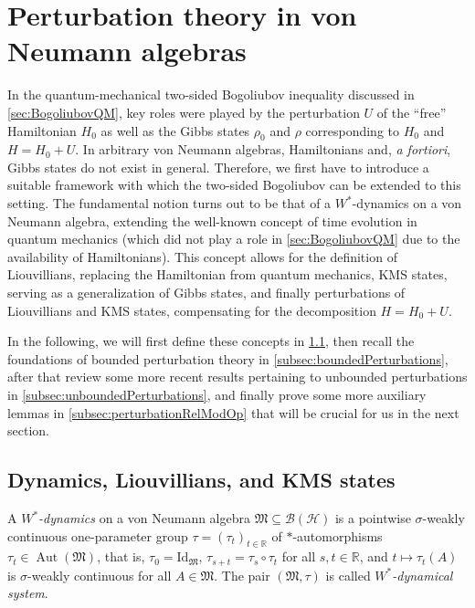 \documentclass[a4paper, twoside, 11pt, reqno]{amsart}
\theoremstyle{definition}
\theoremstyle{plain}
\renewcommand{\subset}{\subseteq}
\newcommand{\R}{\mathbb{R}}
\newcommand{\MH}{\mathcal{H}}
\newcommand{\MFM}{\mathfrak{M}}
\newcommand{\BO}{\mathscr{B}}
\newcommand{\id}{\mathrm{Id}}
\newcommand{\1}{\mathbf{1}}
\DeclareMathOperator{\Aut}{Aut}
\begin{document}
\section{Perturbation theory in von Neumann algebras}\label{sec:perturbationTheory}

In the quantum-mechanical two-sided Bogoliubov inequality discussed in \cref{sec:BogoliubovQM}, key roles were played by the perturbation $U$ of the \enquote{free} Hamiltonian $H_0$ as well as the Gibbs states $\rho_0$ and $\rho$ corresponding to $H_0$ and $H = H_0 + U$. In arbitrary von Neumann algebras, Hamiltonians and, \emph{a fortiori}, Gibbs states do not exist in general. Therefore, we first have to introduce a suitable framework with which the two-sided Bogoliubov can be extended to this setting. The fundamental notion turns out to be that of a $W^\ast$-dynamics on a von Neumann algebra, extending the well-known concept of time evolution in quantum mechanics (which did not play a role in \cref{sec:BogoliubovQM} due to the availability of Hamiltonians). This concept allows for the definition of Liouvillians, replacing the Hamiltonian from quantum mechanics, KMS states, serving as a generalization of Gibbs states, and finally perturbations of Liouvillians and KMS states, compensating for the decomposition $H = H_0 + U$.

In the following, we will first define these concepts in \cref{subsec:dynamics}, then recall the foundations of bounded perturbation theory in \cref{subsec:boundedPerturbations}, after that review some more recent results pertaining to unbounded perturbations in \cref{subsec:unboundedPerturbations}, and finally prove some more auxiliary lemmas in \cref{subsec:perturbationRelModOp} that will be crucial for us in the next section.


\subsection{Dynamics, Liouvillians, and KMS states}\label{subsec:dynamics}

A \emph{$W^\ast$-dynamics} on a von Neumann algebra $\MFM \subset \BO(\MH)$ is a pointwise $\sigma$-weakly continuous one-parameter group $\tau = (\tau_t)_{t \in \R}$ of $\ast$-automorphisms $\tau_t \in \Aut(\MFM)$, that is, $\tau_0 = \id_\MFM$, $\tau_{s+t} = \tau_s \circ \tau_t$ for all $s, t \in \R$, and $t \mapsto \tau_t(A)$ is $\sigma$-weakly continuous for all $A \in \MFM$. The pair $(\MFM, \tau)$ is called \emph{$W^\ast$-dynamical system}.
\end{document}
